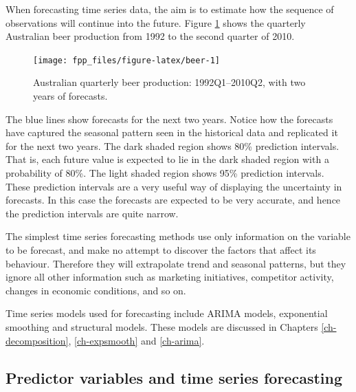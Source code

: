 \documentclass[]{book}
\begin{document}
When forecasting time series data, the aim is to estimate how the sequence of observations will continue into the future. Figure \ref{fig:beer} shows the quarterly Australian beer production from 1992 to the second quarter of 2010.

\begin{figure}

{\centering \texttt{[image: fpp\_files/figure-latex/beer-1]} 

}

\caption{Australian quarterly beer production: 1992Q1–2010Q2, with two years of forecasts.}\label{fig:beer}
\end{figure}

The blue lines show forecasts for the next two years. Notice how the forecasts have captured the seasonal pattern seen in the historical data and replicated it for the next two years. The dark shaded region shows 80\% prediction intervals. That is, each future value is expected to lie in the dark shaded region with a probability of 80\%. The light shaded region shows 95\% prediction intervals. These prediction intervals are a very useful way of displaying the uncertainty in forecasts. In this case the forecasts are expected to be very accurate, and hence the prediction intervals are quite narrow.

The simplest time series forecasting methods use only information on the variable to be forecast, and make no attempt to discover the factors that affect its behaviour. Therefore they will extrapolate trend and seasonal patterns, but they ignore all other information such as marketing initiatives, competitor activity, changes in economic conditions, and so on.

Time series models used for forecasting include ARIMA models, exponential smoothing and structural models. These models are discussed in Chapters \ref{ch-decomposition}, \ref{ch-expsmooth} and \ref{ch-arima}.

\hypertarget{predictor-variables-and-time-series-forecasting}{%
\subsection*{Predictor variables and time series forecasting}\label{predictor-variables-and-time-series-forecasting}}
\end{document}
